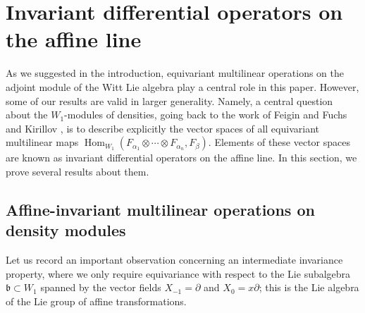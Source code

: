 \documentclass[11pt,reqno]{amsart}
\theoremstyle{plain}
\theoremstyle{definition}
\theoremstyle{remark}
\DeclareMathOperator{\Hom}{Hom}
\begin{document}
\section{Invariant differential operators on the affine line}

As we suggested in the introduction, equivariant multilinear operations on the adjoint module of the Witt Lie algebra play a central role in this paper. However, some of our results are valid in larger generality. Namely, a central question about the $W_1$-modules of densities, going back to the work of Feigin and Fuchs \cite{MR554429} and Kirillov \cite{MR611158}, is to describe explicitly the vector spaces of all equivariant multilinear maps 
$\Hom_{W_1}(F_{\alpha_1}\otimes\cdots\otimes F_{\alpha_n},F_\beta)$.  
Elements of these vector spaces are known as invariant differential operators on the affine line. In this section, we prove several results about them.

\subsection{Affine-invariant multilinear operations on density modules}

Let us record an important observation concerning an intermediate invariance property, where we only require equivariance with respect to the Lie  subalgebra $\mathfrak{b}\subset W_1$ spanned by the vector fields $X_{-1}=\partial$ and $X_0=x\partial$; this is the Lie algebra of the Lie group of affine transformations.
\end{document}
